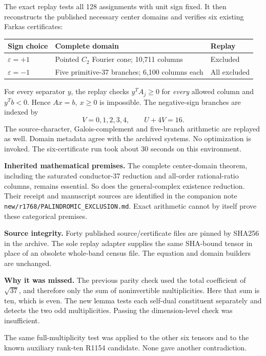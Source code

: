 \documentclass[11pt,a4paper]{article}
\begin{document}
The exact replay tests all 128 assignments with unit sign fixed. It then reconstructs the published necessary center domains and verifies six existing Farkas certificates:
\begin{center}
\begin{tabular}{@{}lll@{}}
\toprule
Sign choice & Complete domain & Replay\\
\midrule
\(\varepsilon=+1\) & Pointed \(C_2\) Fourier cone; 10,711 columns & Excluded\\
\(\varepsilon=-1\) & Five primitive-37 branches; 6,100 columns each & All excluded\\
\bottomrule
\end{tabular}
\end{center}
For every separator \(y\), the replay checks \(y^TA_j\ge0\) for \emph{every} allowed column and \(y^Tb<0\). Hence \(Ax=b,\ x\ge0\) is impossible. The negative-sign branches are indexed by
\[
V=0,1,2,3,4,\qquad U+4V=16.
\]
The source-character, Galois-complement and five-branch arithmetic are replayed as well. Domain metadata agree with the archived systems. No optimization is invoked. The six-certificate run took about 30 seconds on this environment.

\textbf{Inherited mathematical premises.} The complete center-domain theorem, including the saturated conductor-37 reduction and all-order rational-ratio columns, remains essential. So does the general-complex existence reduction. Their receipt and manuscript sources are identified in the companion note
\texttt{new/r1768/PALINDROMIC\_EXCLUSION.md}. Exact arithmetic cannot by itself prove these categorical premises.

\textbf{Source integrity.} Forty published source/certificate files are pinned by SHA256 in the archive. The sole replay adapter supplies the same SHA-bound tensor in place of an obsolete whole-band census file. The equation and domain builders are unchanged.

\textbf{Why it was missed.} The previous parity check used the total coefficient of \(\sqrt{37}\), and therefore only the sum of noninvertible multiplicities. Here that sum is ten, which is even. The new lemma tests each self-dual constituent separately and detects the two odd multiplicities. Passing the dimension-level check was insufficient.

The same full-multiplicity test was applied to the other six tensors and to the known auxiliary rank-ten R1154 candidate. None gave another contradiction.
\end{document}
